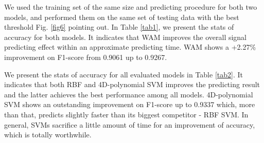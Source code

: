 \documentclass[journal,twoside]{IEEEtran}
\begin{document}
We used the training set of the same size and predicting procedure for both two models, and performed them on the same set of testing data with the best threshold Fig. \ref{fig6} pointing out. In Table \ref{tab1}, we present the stats of accuracy for both models. It indicates that WAM improves the overall signal predicting effect within an approximate predicting time. WAM shows a +2.27\% improvement on F1-score from 0.9061 up to 0.9267. 

We present the stats of accuracy for all evaluated models in Table \ref{tab2}. It indicates that both RBF and 4D-polynomial SVM improves the predicting result and the latter achieves the best performance among all models. 4D-polynomial SVM shows an outstanding improvement on F1-score up to 0.9337 which, more than that, predicts slightly faster than its biggest competitor - RBF SVM. In general, SVMs sacrifice a little amount of time for an improvement of accuracy, which is totally worthwhile. 
\end{document}
